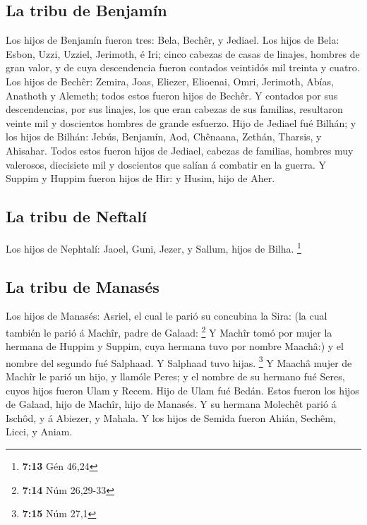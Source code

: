 \hypertarget{la-tribu-de-benjamuxedn}{%
\subsection{La tribu de Benjamín}\label{la-tribu-de-benjamuxedn}}

 Los hijos de Benjamín fueron tres: Bela, Bechêr, y
Jediael.  Los hijos de Bela: Esbon, Uzzi, Uzziel,
Jerimoth, é Iri; cinco cabezas de casas de linajes, hombres de gran
valor, y de cuya descendencia fueron contados veintidós mil treinta y
cuatro.  Los hijos de Bechêr: Zemira, Joas, Eliezer,
Elioenai, Omri, Jerimoth, Abías, Anathoth y Alemeth; todos estos fueron
hijos de Bechêr.  Y contados por sus descendencias, por
sus linajes, los que eran cabezas de sus familias, resultaron veinte mil
y doscientos hombres de grande esfuerzo.  Hijo de Jediael
fué Bilhán; y los hijos de Bilhán: Jebús, Benjamín, Aod, Chênaana,
Zethán, Tharsis, y Ahisahar.  Todos estos fueron hijos de
Jediael, cabezas de familias, hombres muy valerosos, diecisiete mil y
doscientos que salían á combatir en la guerra.  Y Suppim
y Huppim fueron hijos de Hir: y Husim, hijo de Aher.

\hypertarget{la-tribu-de-neftaluxed}{%
\subsection{La tribu de Neftalí}\label{la-tribu-de-neftaluxed}}

 Los hijos de Nephtalí: Jaoel, Guni, Jezer, y Sallum,
hijos de Bilha. \footnote{\textbf{7:13} Gén 46,24}

\hypertarget{la-tribu-de-manasuxe9s}{%
\subsection{La tribu de Manasés}\label{la-tribu-de-manasuxe9s}}

 Los hijos de Manasés: Asriel, el cual le parió su
concubina la Sira: (la cual también le parió á Machîr, padre de Galaad:
\footnote{\textbf{7:14} Núm 26,29-33}  Y Machîr tomó por
mujer la hermana de Huppim y Suppim, cuya hermana tuvo por nombre
Maachâ:) y el nombre del segundo fué Salphaad. Y Salphaad tuvo hijas.
\footnote{\textbf{7:15} Núm 27,1}  Y Maachâ mujer de
Machîr le parió un hijo, y llamóle Peres; y el nombre de su hermano fué
Seres, cuyos hijos fueron Ulam y Recem.  Hijo de Ulam fué
Bedán. Estos fueron los hijos de Galaad, hijo de Machîr, hijo de
Manasés.  Y su hermana Molechêt parió á Ischôd, y á
Abiezer, y Mahala.  Y los hijos de Semida fueron Ahián,
Sechêm, Licci, y Aniam.

